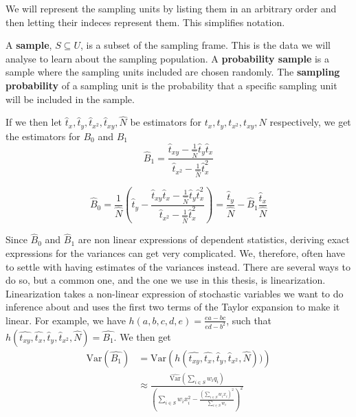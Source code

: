 \documentclass{article}
\begin{document}
We will represent the sampling units by listing them in an arbitrary order and
then letting their indeces represent them. This simplifies notation.


\begin{definition} \label{def:sample}
A \textbf{sample}, \(S \subseteq U\), is a subset of the sampling frame. This is the data we will analyse to learn about the sampling population.
A \textbf{probability sample} is a sample where the sampling units included are chosen randomly.
The \textbf{sampling probability} of a sampling unit is the probability that a
specific sampling unit will be included in the sample.
\end{definition}


If we then let \(\hat{t}_x, \hat{t}_y, \hat{t}_{x^2}, \hat{t}_{xy}, \hat{N}\) be estimators
for \(t_x, t_y, t_{x^2},
t_{xy}, N\) respectively, we get the estimators for \(B_0\) and \(B_1\)
\begin{equation*}
 \hat{B}_1 = \frac{\hat{t}_{xy} - \frac{1}{\widehat{N}} \hat{t}_y \hat{t}_x}
   {\hat{t}_{x^2} - \frac{1}{\widehat{N}} \hat{t}_x^2}
\end{equation*}

\begin{equation*}
 \hat{B}_0 = \frac{1}{\widehat{N}} \left( \hat{t}_y - \frac{\hat{t}_{xy} \hat{t}_x - \frac{1}{\widehat{N}} \hat{t}_y \hat{t}_x^2}
   {\hat{t}_{x^2} - \frac{1}{\widehat{N}} \hat{t}_x^2}
 \right)
 = \frac{\hat{t}_y}{\hat{N}} - \hat{B}_1\frac{\hat{t}_x}{\hat{N}}
\end{equation*}

Since \(\hat{B}_0\) and \(\hat{B}_1\) are non linear expressions of dependent
statistics, deriving exact expressions for the variances can get very complicated. We, therefore,
often have to settle with having estimates of the variances instead.
There are several ways to do so, but a common one,
and the one we use in this thesis, is linearization. Linearization takes a
non-linear expression of stochastic variables we want to do inference about and uses
the first two terms of the Taylor expansion to make it linear.
For example, we have \(h(a, b, c, d, e) = \frac{ea - bc}{ed - b^2}\), such that
\(h(\hat{t_{xy}}, \hat{t_x}, \hat{t}_y, \hat{t}_{x^2}, \hat{N}) = \hat{B_1}\).
We then get\begin{align*}
 \mathrm{Var}(\hat{B_1})
 &= \mathrm{Var} \left( h(\hat{t_{xy}}, \hat{t_x},
 \hat{t}_y, \hat{t}_{x^2}, \hat{N})) \right) \\
 &\approx \frac{\widehat{\mathrm{Var}}\left( \sum_{i \in S} w_i q_i \right)}
   {\left( \sum_{i \in S} w_i x_i^2 - \frac{\left( \sum_{i \in S} w_i x_i \right)^2}{\sum_{i \in S} w_i} \right)^2}
\end{align*}
\end{document}
